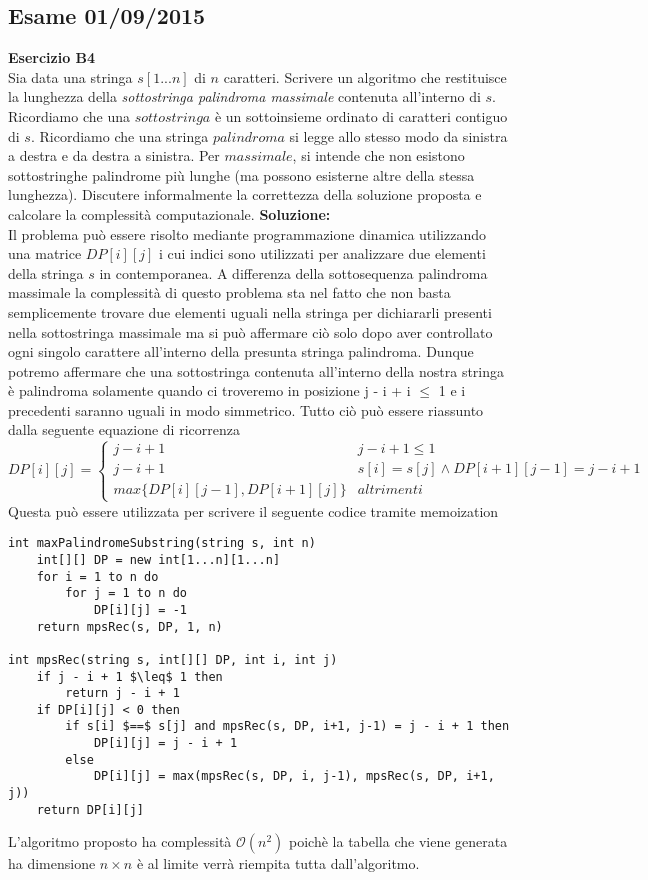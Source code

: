 \documentclass[../cheatSheetAlgoritmi.tex]{subfiles}
\begin{document}
\subsection{Esame 01/09/2015}
\textbf{Esercizio B4}\\
Sia data una stringa $s[1...n]$ di $n$ caratteri. Scrivere un algoritmo che restituisce la lunghezza della \emph{sottostringa palindroma massimale} contenuta all’interno di $s$. Ricordiamo che una $sottostringa$ è un sottoinsieme ordinato di caratteri contiguo di $s$. Ricordiamo che una stringa $palindroma$ si legge allo stesso modo da sinistra a destra e da destra a sinistra. Per $massimale$, si intende che non esistono sottostringhe palindrome più lunghe (ma possono esisterne altre della stessa lunghezza). Discutere informalmente la correttezza della soluzione proposta e calcolare la complessità computazionale.
\textbf{Soluzione:}\\
Il problema può essere risolto mediante programmazione dinamica utilizzando una matrice $DP[i][j]$ i cui indici sono utilizzati per analizzare due elementi della stringa $s$ in contemporanea. A differenza della sottosequenza palindroma massimale la complessità di questo problema sta nel fatto che non basta semplicemente trovare due elementi uguali nella stringa per dichiararli presenti nella sottostringa massimale ma si può affermare ciò solo dopo aver controllato ogni singolo carattere all'interno della presunta stringa palindroma. Dunque potremo affermare che una sottostringa contenuta all'interno della nostra stringa è palindroma solamente quando ci troveremo in posizione j - i + i $\leq$ 1 e i precedenti saranno uguali in modo simmetrico. Tutto ciò può essere riassunto dalla seguente equazione di ricorrenza
\begin{equation*}
  	DP[i][j]=\begin{cases}
  		j - i + 1 & \text{$j - i + 1 \leq 1$}\\
  		j - i + 1 & \text{$s[i] = s[j] \land DP[i+1][j-1] = j - i + 1$}\\
  		max\{DP[i][j-1], DP[i+1][j]\} & \text{$altrimenti$}
  	\end{cases}
\end{equation*}
Questa può essere utilizzata per scrivere il seguente codice tramite memoization
\begin{lstlisting}[caption=Sottostringa Palindroma Massimale]
int maxPalindromeSubstring(string s, int n)
	int[][] DP = new int[1...n][1...n]
	for i = 1 to n do
		for j = 1 to n do
			DP[i][j] = -1
	return mpsRec(s, DP, 1, n)
	
int mpsRec(string s, int[][] DP, int i, int j)
	if j - i + 1 $\leq$ 1 then
		return j - i + 1
	if DP[i][j] < 0 then
		if s[i] $==$ s[j] and mpsRec(s, DP, i+1, j-1) = j - i + 1 then
			DP[i][j] = j - i + 1
		else 
			DP[i][j] = max(mpsRec(s, DP, i, j-1), mpsRec(s, DP, i+1, j)) 
	return DP[i][j]
\end{lstlisting}
L'algoritmo proposto ha complessità $\mathcal{O}(n^{2})$ poichè la tabella che viene generata ha dimensione $n \times n$ è al limite verrà riempita tutta dall'algoritmo. 
\newpage
\end{document}
